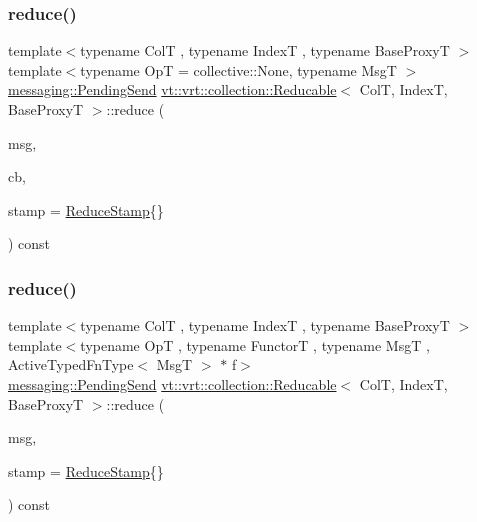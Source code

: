 \subsubsection{\texorpdfstring{reduce()}{reduce()}\hspace{0.1cm}{\footnotesize\ttfamily [2/6]}}
{\footnotesize\ttfamily template$<$typename ColT , typename IndexT , typename Base\+ProxyT $>$ \\
template$<$typename OpT  = collective\+::\+None, typename MsgT $>$ \\
\hyperlink{structvt_1_1messaging_1_1_pending_send}{messaging\+::\+Pending\+Send} \hyperlink{structvt_1_1vrt_1_1collection_1_1_reducable}{vt\+::vrt\+::collection\+::\+Reducable}$<$ ColT, IndexT, Base\+ProxyT $>$\+::reduce (\begin{DoxyParamCaption}\item[{MsgT $\ast$const}]{msg,  }\item[{\hyperlink{namespacevt_a36db99df4c973d48b1118a293fff533f}{Callback}$<$ MsgT $>$}]{cb,  }\item[{\hyperlink{structvt_1_1vrt_1_1collection_1_1_reducable_a19f80baf23f36dad4948ef07322fd0cb}{Reduce\+Stamp}}]{stamp = {\ttfamily \hyperlink{structvt_1_1vrt_1_1collection_1_1_reducable_a19f80baf23f36dad4948ef07322fd0cb}{Reduce\+Stamp}\{\}} }\end{DoxyParamCaption}) const\hspace{0.3cm}{\ttfamily [inline]}}

\mbox{\label{structvt_1_1vrt_1_1collection_1_1_reducable_a6550107ef0246a7479dec51b015aa0f5}} 
\subsubsection{\texorpdfstring{reduce()}{reduce()}\hspace{0.1cm}{\footnotesize\ttfamily [3/6]}}
{\footnotesize\ttfamily template$<$typename ColT , typename IndexT , typename Base\+ProxyT $>$ \\
template$<$typename OpT , typename FunctorT , typename MsgT , Active\+Typed\+Fn\+Type$<$ Msg\+T $>$ $\ast$ f$>$ \\
\hyperlink{structvt_1_1messaging_1_1_pending_send}{messaging\+::\+Pending\+Send} \hyperlink{structvt_1_1vrt_1_1collection_1_1_reducable}{vt\+::vrt\+::collection\+::\+Reducable}$<$ ColT, IndexT, Base\+ProxyT $>$\+::reduce (\begin{DoxyParamCaption}\item[{MsgT $\ast$const}]{msg,  }\item[{\hyperlink{structvt_1_1vrt_1_1collection_1_1_reducable_a19f80baf23f36dad4948ef07322fd0cb}{Reduce\+Stamp}}]{stamp = {\ttfamily \hyperlink{structvt_1_1vrt_1_1collection_1_1_reducable_a19f80baf23f36dad4948ef07322fd0cb}{Reduce\+Stamp}\{\}} }\end{DoxyParamCaption}) const}

